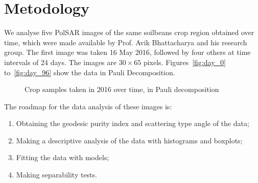 \documentclass[journal]{IEEEtran}
\begin{document}


\section{Metodology}

We analyse five PolSAR images of the same soilbeans crop region obtained over time, which were made available by Prof. Avik Bhattacharya and his research group. The first image was taken 16 May 2016, followed by four others at time intervals of \num{24} days. The images are $30 \times 65$ pixels.
Figures~\ref{fig:day_0} to~\ref{fig:day_96} show the data in Pauli Decomposition. 

\begin{figure}[hbt]
  \centering
  \caption{Crop samples taken in 2016 over time, in Pauli decomposition}
  \label{fig:sample_images}
\end{figure}

The roadmap for the data analysis of these images is:
\begin{enumerate}
  \item Obtaining the geodesic purity index and scattering type angle of the data;
  \item Making a descriptive analysis of the data with histograms and boxplots;
  \item Fitting the data with models;
  \item Making separability tests.
\end{enumerate}
\end{document}
